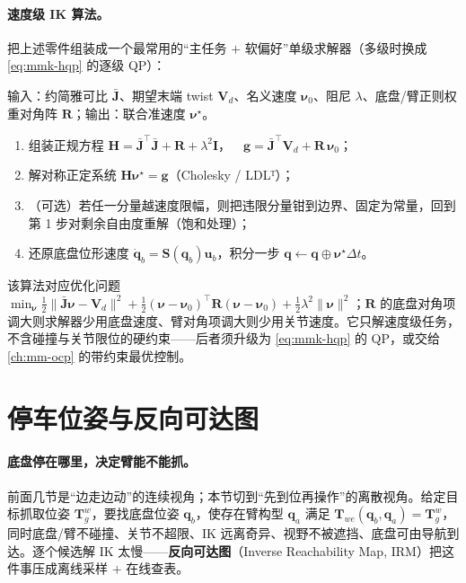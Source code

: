 \paragraph{速度级 IK 算法。}
把上述零件组装成一个最常用的“主任务 $+$ 软偏好”单级求解器（多级时换成 \cref{eq:mmk-hqp} 的逐级 QP）：

\begin{algo}\label{alg:mmk-velik}
输入：约简雅可比 $\bar{\mathbf{J}}$、期望末端 twist $\mathbf{V}_d$、名义速度 $\boldsymbol{\nu}_0$、阻尼 $\lambda$、底盘/臂正则权重对角阵 $\mathbf{R}$；输出：联合准速度 $\boldsymbol{\nu}^\star$。
\begin{enumerate}
  \item 组装正规方程 $\mathbf{H}=\bar{\mathbf{J}}^\top\bar{\mathbf{J}}+\mathbf{R}+\lambda^2\mathbf{I}$，$\quad\mathbf{g}=\bar{\mathbf{J}}^\top\mathbf{V}_d+\mathbf{R}\,\boldsymbol{\nu}_0$；
  \item 解对称正定系统 $\mathbf{H}\boldsymbol{\nu}^\star=\mathbf{g}$（Cholesky / LDLᵀ）；
  \item （可选）若任一分量越速度限幅，则把违限分量钳到边界、固定为常量，回到第 1 步对剩余自由度重解（饱和处理）；
  \item 还原底盘位形速度 $\dot{\mathbf{q}}_b=\mathbf{S}(\mathbf{q}_b)\mathbf{u}_b$，积分一步 $\mathbf{q}\leftarrow\mathbf{q}\oplus\boldsymbol{\nu}^\star\Delta t$。
\end{enumerate}
该算法对应优化问题 $\min_{\boldsymbol{\nu}}\tfrac12\|\bar{\mathbf{J}}\boldsymbol{\nu}-\mathbf{V}_d\|^2+\tfrac12(\boldsymbol{\nu}-\boldsymbol{\nu}_0)^\top\mathbf{R}(\boldsymbol{\nu}-\boldsymbol{\nu}_0)+\tfrac12\lambda^2\|\boldsymbol{\nu}\|^2$；$\mathbf{R}$ 的底盘对角项调大则求解器少用底盘速度、臂对角项调大则少用关节速度。它只解速度级任务，不含碰撞与关节限位的硬约束——后者须升级为 \cref{eq:mmk-hqp} 的 QP，或交给 \cref{ch:mm-ocp} 的带约束最优控制。
\end{algo}

\section{停车位姿与反向可达图}
\label{sec:mmk-irm}

\paragraph{底盘停在哪里，决定臂能不能抓。}
前面几节是“边走边动”的连续视角；本节切到“先到位再操作”的离散视角。给定目标抓取位姿 $\mathbf{T}_g^w$，要找底盘位姿 $\mathbf{q}_b$，使存在臂构型 $\mathbf{q}_a$ 满足 $\mathbf{T}_{we}(\mathbf{q}_b,\mathbf{q}_a)=\mathbf{T}_g^w$，同时底盘/臂不碰撞、关节不超限、IK 远离奇异、视野不被遮挡、底盘可由导航到达。逐个候选解 IK 太慢——\textbf{反向可达图}（Inverse Reachability Map, IRM）把这件事压成离线采样 $+$ 在线查表。

